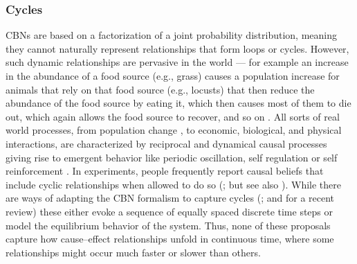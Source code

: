 \documentclass{cambridge7A}%
\begin{document}


\subsubsection{Cycles}

CBNs are based on a factorization of a joint probability distribution, meaning they cannot naturally represent relationships that form loops or cycles.  However, such dynamic relationships are pervasive in the world --- for example an increase in the abundance of a food source (e.g., grass) causes a population increase for animals that rely on that food source (e.g., locusts) that then reduce the abundance of the food source by eating it, which then causes most of them to die out, which again allows the food source to recover, and so on \citep{white2008beliefs,odum1959fundamentals}.  All sorts of real world processes, from population change \citep{malthus1888essay}, to economic, biological, and physical interactions, are characterized by reciprocal and dynamical causal processes giving rise to emergent behavior like periodic oscillation, self regulation or self reinforcement .  In experiments, people frequently report causal beliefs that include cyclic relationships when allowed to do so (\citealp{nikolic2015there,kim2002clinical,sloman1998feature}; but see also \citealp{white2008beliefs}).
While there are ways of adapting the CBN formalism to capture cycles (\citealp[e.g.][]{dean1989model,lauritzen2002chain}; and \citealp{rehder2016cycles} for a recent review) these either evoke a sequence of equally spaced discrete time steps or model the equilibrium behavior of the system.  Thus, none of these proposals capture how cause--effect relationships unfold in continuous time, where some relationships might occur much faster or slower than others.%
\end{document}
